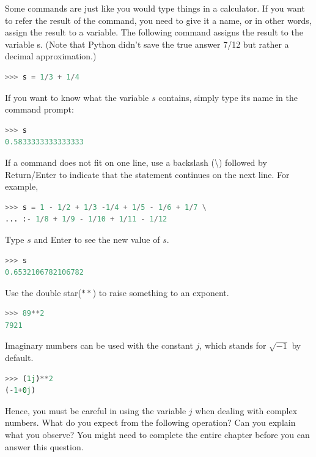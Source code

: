 \vs

Some commands are just like you would type things in a calculator. If you want to refer the result of the command, you need to give it a name, or in other words, assign the result to a variable. The following command assigns the result to the variable s. (Note that Python didn't save the true answer 7/12 but rather a decimal approximation.)

\begin{lstlisting}[language=Python]
>>> s = 1/3 + 1/4
\end{lstlisting}

If you want to know what the variable $s$ contains, simply type its name in the command prompt: 

\begin{lstlisting}[language=Python]
>>> s
0.5833333333333333 
\end{lstlisting}

If a command does not fit on one line, use a backslash (\textbackslash) followed by Return/Enter to indicate that the statement continues on the next line. For example,

\begin{lstlisting}[language=Python]
>>> s = 1 - 1/2 + 1/3 -1/4 + 1/5 - 1/6 + 1/7 \
... :- 1/8 + 1/9 - 1/10 + 1/11 - 1/12  
\end{lstlisting}

Type $s$ and Enter to see the new value of $s$. 

\begin{lstlisting}[language=Python]
>>> s
0.6532106782106782
\end{lstlisting}

Use the double star($**$) to raise something to an exponent.

\begin{lstlisting}[language=Python]
>>> 89**2
7921 
\end{lstlisting}

Imaginary numbers can be used with the constant $j$, which stands for $\sqrt{-1}$ by default. 

\begin{lstlisting}[language=Python]
>>> (1j)**2
(-1+0j)
\end{lstlisting}

Hence, you must be careful in using the variable $j$ when dealing with complex numbers. What do you expect from the following operation? Can you explain what you observe? You might need to complete the entire  chapter before you can answer this question. \QA

